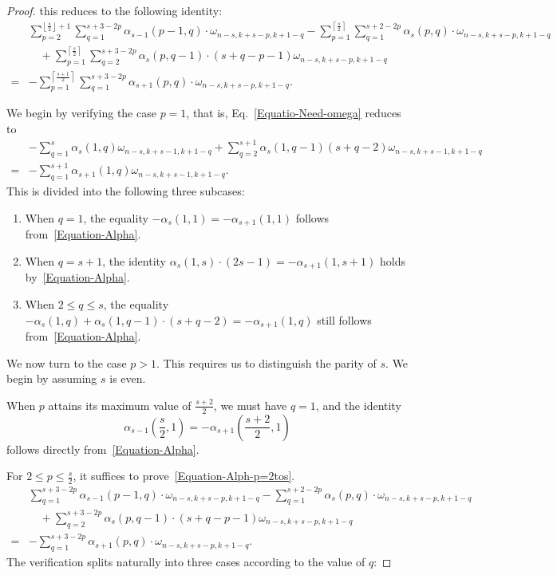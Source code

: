 \documentclass[10pt,a4paper]{amsart}
\begin{document}
\begin{proof}
this reduces to the following identity:
\begin{align}
& \sum_{p=2}^{\left\lfloor \frac{s}{2}\right\rfloor+1} \sum_{q=1}^{s+3-2p} \alpha_{s-1}(p-1,q)\cdot \omega_{n-s,k+s-p,k+1-q}
 -\sum_{p=1}^{\left\lceil \frac{s}{2}\right\rceil} \sum_{q=1}^{s+2-2p} \alpha_{s}(p,q)\cdot \omega_{n-s,k+s-p,k+1-q}  \nonumber
\\ &\quad +\sum_{p=1}^{\left\lceil \frac{s}{2}\right\rceil} \sum_{q=2}^{s+3-2p} \alpha_{s}(p,q-1)\cdot (s+q-p-1)\omega_{n-s, k+s-p, k+1-q}\label{Equatio-Need-omega}
\\= &-\sum_{p=1}^{\left\lceil \frac{s+1}{2}\right\rceil} \sum_{q=1}^{s+3-2p} \alpha_{s+1}(p,q)\cdot \omega_{n-s,k+s-p,k+1-q}. \nonumber
\end{align}

We begin by verifying the case $p=1$, that is,  Eq.~\eqref{Equatio-Need-omega} reduces to
\begin{align*}
&-\sum_{q=1}^{s}\alpha_s(1,q) \omega_{n-s,k+s-1,k+1-q}+\sum_{q=2}^{s+1}\alpha_s(1,q-1)(s+q-2)\omega_{n-s,k+s-1,k+1-q}
\\ =&-\sum_{q=1}^{s+1}\alpha_{s+1}(1,q)\omega_{n-s,k+s-1,k+1-q}.
\end{align*}
This is divided into the following three subcases:
\begin{enumerate}
\item When $q=1$, the equality $-\alpha_s(1,1)=-\alpha_{s+1}(1,1)$ follows from~\eqref{Equation-Alpha}.
\item When $q=s+1$, the identity $\alpha_s(1,s)\cdot (2s-1)=-\alpha_{s+1}(1,s+1)$ holds by~\eqref{Equation-Alpha}.
\item When $2\leq q\leq s$, the equality $-\alpha_s(1,q)+\alpha_s(1,q-1)\cdot (s+q-2)=-\alpha_{s+1}(1,q)$ still follows from~\eqref{Equation-Alpha}.
\end{enumerate}

We now turn to the case $p>1$. This requires us to distinguish the parity of $s$. We begin by assuming $s$ is even.

When $p$ attains its maximum value of $\frac{s+2}{2}$, we must have $q=1$, and the identity
\[
\alpha_{s-1}\left(\frac{s}{2},1\right)=-\alpha_{s+1}\left(\frac{s+2}{2},1\right)
\]
follows directly from~\eqref{Equation-Alpha}.

For $2\leq p\leq \frac{s}{2}$, it suffices to prove~\eqref{Equation-Alph-p=2tos}.
\begin{align}
& \sum_{q=1}^{s+3-2p} \alpha_{s-1}(p-1,q)\cdot \omega_{n-s,k+s-p,k+1-q}
 -\sum_{q=1}^{s+2-2p} \alpha_{s}(p,q)\cdot \omega_{n-s,k+s-p,k+1-q} \nonumber
\\ &\quad +\sum_{q=2}^{s+3-2p} \alpha_{s}(p,q-1)\cdot (s+q-p-1)\omega_{n-s, k+s-p, k+1-q} \label{Equation-Alph-p=2tos}
\\= &- \sum_{q=1}^{s+3-2p} \alpha_{s+1}(p,q)\cdot \omega_{n-s,k+s-p,k+1-q}.\nonumber
\end{align}
The verification splits naturally into three cases according to the value of $q$:


\end{proof}
\end{document}
